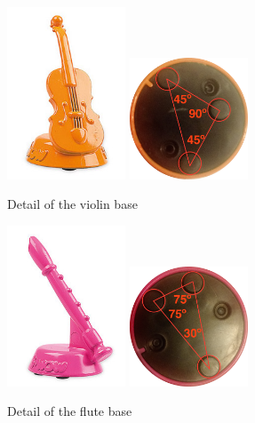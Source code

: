 \begin{figure}[ht!]
	\centering
	\includegraphics[width=100pt]{graphics/architecture/pieces/pieceStrings.jpg}
	\vspace{0.6cm}
	\includegraphics[width=100pt]{graphics/architecture/pieces/stringsBaseAngles.png}
	\caption{Detail of the violin base}
	\label{fig:stringspiecedetailed}
\end{figure}

\begin{figure}[ht!]
	\centering
	\includegraphics[width=100pt]{graphics/architecture/pieces/pieceWoodwind.jpg}
	\vspace{0.6cm}
	\includegraphics[width=100pt]{graphics/architecture/pieces/woodwindBaseAngles.png}
	\caption{Detail of the flute base}
	\label{fig:woodwindpiecedetailed}
\end{figure}


